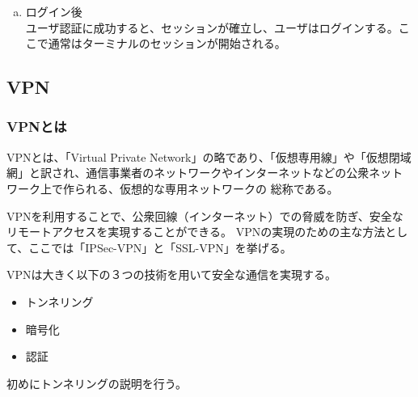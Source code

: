 \documentclass[12pt,a4paper,titlepage]{jsarticle}
\begin{document}
\begin{enumerate}[(a)]
\begin{enumerate}[(1)]
    \end{enumerate}
    \item ログイン後\mbox{}\\
    ユーザ認証に成功すると、セッションが確立し、ユーザはログインする。ここで通常はターミナルのセッションが開始される。
    
\end{enumerate}






\subsection{VPN}

\subsubsection*{VPNとは}
VPNとは、「Virtual Private Network」の略であり、「仮想専用線」や「仮想閉域網」と訳され、通信事業者のネットワークやインターネットなどの公衆ネットワーク上で作られる、仮想的な専用ネットワークの
総称である。


VPNを利用することで、公衆回線（インターネット）での脅威を防ぎ、安全なリモートアクセスを実現することができる。
VPNの実現のための主な方法として、ここでは「IPSec-VPN」と「SSL-VPN」を挙げる。

VPNは大きく以下の３つの技術を用いて安全な通信を実現する。
\begin{itemize}
    \item トンネリング
    \item 暗号化
    \item 認証
\end{itemize}
初めにトンネリングの説明を行う。
\end{document}
